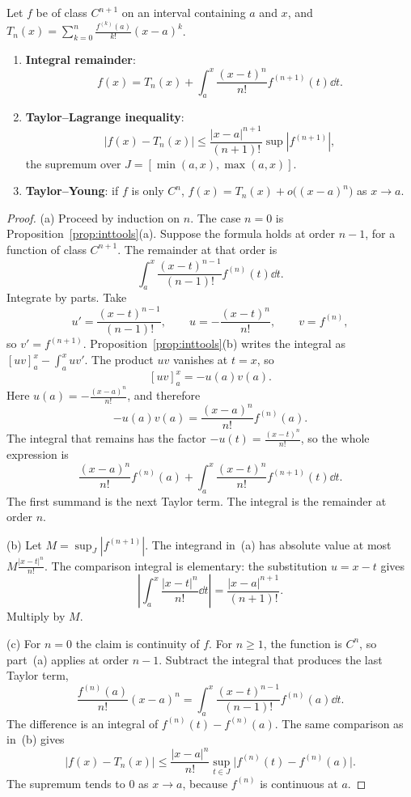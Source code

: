 \begin{theorem}\label{thm:taylor}
Let $f$ be of class $C^{n+1}$ on an interval containing $a$ and $x$, and $T_n(x)=\sum_{k=0}^n\frac{f^{(k)}(a)}{k!}(x-a)^k$.
\begin{enumerate}[label=(\alph*)]
\item \textbf{Integral remainder}:
\[f(x)=T_n(x)+\int_a^x\frac{(x-t)^n}{n!}f^{(n+1)}(t)\dd t.\]
\item \textbf{Taylor--Lagrange inequality}:
\[|f(x)-T_n(x)|\le\frac{|x-a|^{n+1}}{(n+1)!}\sup|f^{(n+1)}|,\]
the supremum over $J=[\min(a,x),\max(a,x)]$.
\item \textbf{Taylor--Young}: if $f$ is only $C^n$, $f(x)=T_n(x)+o\bigl((x-a)^n\bigr)$ as $x\to a$.
\end{enumerate}
\end{theorem}
\begin{proof}
(a) Proceed by induction on $n$. The case $n=0$ is Proposition~\ref{prop:inttools}(a). Suppose the formula holds at order $n-1$, for a function of class $C^{n+1}$. The remainder at that order is
\[
\int_a^x\frac{(x-t)^{n-1}}{(n-1)!}f^{(n)}(t)\dd t.
\]
Integrate by parts. Take
\[
u'=\frac{(x-t)^{n-1}}{(n-1)!},\qquad u=-\frac{(x-t)^n}{n!},\qquad v=f^{(n)},
\]
so $v'=f^{(n+1)}$. Proposition~\ref{prop:inttools}(b) writes the integral as $[uv]_a^x-\int_a^x uv'$. The product $uv$ vanishes at $t=x$, so
\[
[uv]_a^x=-u(a)v(a).
\]
Here $u(a)=-\frac{(x-a)^n}{n!}$, and therefore
\[
-u(a)v(a)=\frac{(x-a)^n}{n!}f^{(n)}(a).
\]
The integral that remains has the factor $-u(t)=\frac{(x-t)^n}{n!}$, so the whole expression is
\[
\frac{(x-a)^n}{n!}f^{(n)}(a)+\int_a^x\frac{(x-t)^n}{n!}f^{(n+1)}(t)\dd t.
\]
The first summand is the next Taylor term. The integral is the remainder at order $n$.

(b) Let $M=\sup_J|f^{(n+1)}|$. The integrand in~(a) has absolute value at most $M\frac{|x-t|^n}{n!}$. The comparison integral is elementary: the substitution $u=x-t$ gives
\[
\left|\int_a^x\frac{|x-t|^n}{n!}\dd t\right|=\frac{|x-a|^{n+1}}{(n+1)!}.
\]
Multiply by $M$.

(c) For $n=0$ the claim is continuity of $f$. For $n\ge1$, the function is $C^n$, so part~(a) applies at order $n-1$. Subtract the integral that produces the last Taylor term,
\[
\frac{f^{(n)}(a)}{n!}(x-a)^n=\int_a^x\frac{(x-t)^{n-1}}{(n-1)!}f^{(n)}(a)\dd t.
\]
The difference is an integral of $f^{(n)}(t)-f^{(n)}(a)$. The same comparison as in~(b) gives
\[
|f(x)-T_n(x)|\le\frac{|x-a|^n}{n!}\sup_{t\in J}\bigl|f^{(n)}(t)-f^{(n)}(a)\bigr|.
\]
The supremum tends to $0$ as $x\to a$, because $f^{(n)}$ is continuous at $a$.
\end{proof}

